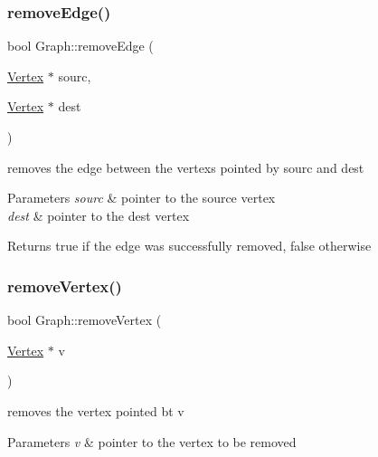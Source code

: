 \subsubsection{\texorpdfstring{remove\+Edge()}{removeEdge()}}
{\footnotesize\ttfamily bool Graph\+::remove\+Edge (\begin{DoxyParamCaption}\item[{\hyperlink{class_vertex}{Vertex} $\ast$}]{sourc,  }\item[{\hyperlink{class_vertex}{Vertex} $\ast$}]{dest }\end{DoxyParamCaption})}



removes the edge between the vertexs pointed by sourc and dest 


\begin{DoxyParams}{Parameters}
{\em sourc} & pointer to the source vertex\\
\hline
{\em dest} & pointer to the dest vertex\\
\hline
\end{DoxyParams}
\begin{DoxyReturn}{Returns}
true if the edge was successfully removed, false otherwise 
\end{DoxyReturn}
\hypertarget{class_graph_ad3efda9573757644ea501c8078b5ee4b}{}\label{class_graph_ad3efda9573757644ea501c8078b5ee4b} 
\subsubsection{\texorpdfstring{remove\+Vertex()}{removeVertex()}}
{\footnotesize\ttfamily bool Graph\+::remove\+Vertex (\begin{DoxyParamCaption}\item[{\hyperlink{class_vertex}{Vertex} $\ast$}]{v }\end{DoxyParamCaption})}



removes the vertex pointed bt v 


\begin{DoxyParams}{Parameters}
{\em v} & pointer to the vertex to be removed \\
\hline
\end{DoxyParams}
\hypertarget{class_graph_ae9f070d976df3f47d55246bd7268f160}{}\label{class_graph_ae9f070d976df3f47d55246bd7268f160} 
